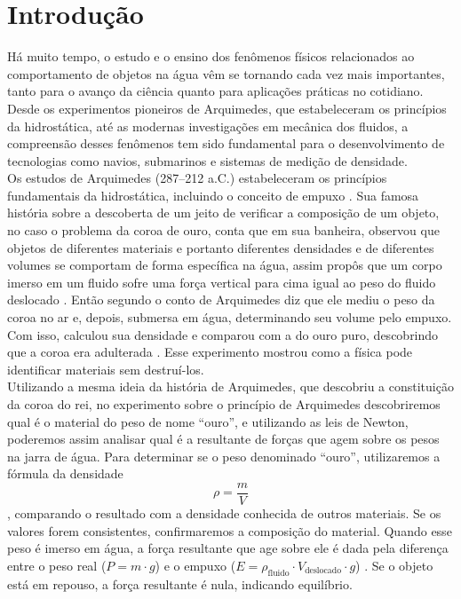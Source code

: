 \section{Introdução}

Há muito tempo, o estudo e o ensino dos fenômenos físicos relacionados ao comportamento de objetos na água vêm se tornando cada vez mais importantes, tanto para o avanço da ciência quanto para aplicações práticas no cotidiano. Desde os experimentos pioneiros de Arquimedes, que estabeleceram os princípios da hidrostática, até as modernas investigações em mecânica dos fluidos, a compreensão desses fenômenos tem sido fundamental para o desenvolvimento de tecnologias como navios, submarinos e sistemas de medição de densidade.\\

Os estudos de Arquimedes (287--212 a.C.) estabeleceram os princípios fundamentais da hidrostática, incluindo o conceito de empuxo \cite{meneses2018}. Sua famosa história sobre a descoberta de um jeito de verificar a composição de um objeto, no caso o problema da coroa de ouro, conta que em sua banheira, observou que objetos de diferentes materiais e portanto diferentes densidades e de diferentes volumes se comportam de forma específica na água, assim propôs que um corpo imerso em um fluido sofre uma força vertical para cima igual ao peso do fluido deslocado \cite{nussenzveig2014}. Então segundo o conto de Arquimedes diz que ele mediu o peso da coroa no ar e, depois, submersa em água, determinando seu volume pelo empuxo. Com isso, calculou sua densidade e comparou com a do ouro puro, descobrindo que a coroa era adulterada \cite{thompson2008}. Esse experimento mostrou como a física pode identificar materiais sem destruí-los.\\

Utilizando a mesma ideia da história de Arquimedes, que descobriu a constituição da coroa do rei, no experimento sobre o princípio de Arquimedes descobriremos qual é o material do peso de nome ``ouro'', e utilizando as leis de Newton, poderemos assim analisar qual é a resultante de forças que agem sobre os pesos na jarra de água. Para determinar se o peso denominado ``ouro'', utilizaremos a fórmula da densidade
\begin{equation}
	\rho = \frac{m}{V} \label{eq:densidade}
\end{equation}
\cite{nussenzveig2014}, comparando o resultado com a densidade conhecida de outros materiais. Se os valores forem consistentes, confirmaremos a composição do material. Quando esse peso é imerso em água, a força resultante que age sobre ele é dada pela diferença entre o peso real ($P = m \cdot g$) e o empuxo ($E = \rho_{\text{fluido}} \cdot V_{\text{deslocado}} \cdot g$) \cite{nussenzveig2014}. Se o objeto está em repouso, a força resultante é nula, indicando equilíbrio.\\

